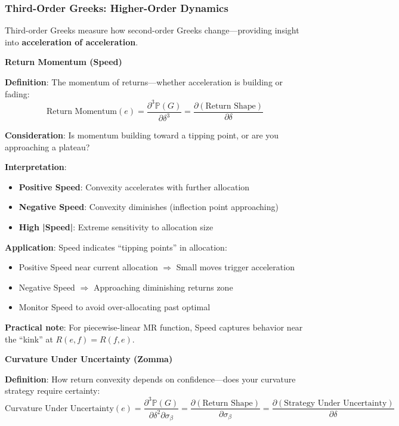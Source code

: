 \subsubsection{Third-Order Greeks: Higher-Order Dynamics}

Third-order Greeks measure how second-order Greeks change---providing insight into \textbf{acceleration of acceleration}.

\textbf{Return Momentum (Speed)}

\textbf{Definition}: The momentum of returns---whether acceleration is building or fading:
\[ \text{Return Momentum}(e) = \frac{\partial^3 \mathbb{P}(G)}{\partial \delta^3} = \frac{\partial (\text{Return Shape})}{\partial \delta} \]

\textbf{Consideration}: Is momentum building toward a tipping point, or are you approaching a plateau?

\textbf{Interpretation}:
\begin{itemize}
\item \textbf{Positive Speed}: Convexity accelerates with further allocation
\item \textbf{Negative Speed}: Convexity diminishes (inflection point approaching)
\item \textbf{High |Speed|}: Extreme sensitivity to allocation size
\end{itemize}

\textbf{Application}: Speed indicates ``tipping points'' in allocation:
\begin{itemize}
\item Positive Speed near current allocation $\Rightarrow$ Small moves trigger acceleration
\item Negative Speed $\Rightarrow$ Approaching diminishing returns zone
\item Monitor Speed to avoid over-allocating past optimal
\end{itemize}

\textbf{Practical note}: For piecewise-linear MR function, Speed captures behavior near the ``kink'' at $R(e,f) = R(f,e)$.

\textbf{Curvature Under Uncertainty (Zomma)}

\textbf{Definition}: How return convexity depends on confidence---does your curvature strategy require certainty:
\[ \text{Curvature Under Uncertainty}(e) = \frac{\partial^3 \mathbb{P}(G)}{\partial \delta^2 \partial \sigma_\beta} = \frac{\partial (\text{Return Shape})}{\partial \sigma_\beta} = \frac{\partial (\text{Strategy Under Uncertainty})}{\partial \delta} \]

